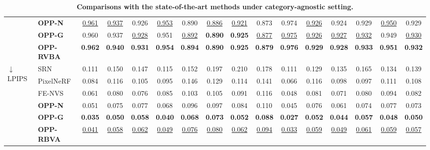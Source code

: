 \begin{table}[t]
\begin{adjustbox}{width=\linewidth,center}
\begin{tabular}{l| l c c c c c c c c c c c c c c}
                                        \cline{2-16}
                                        &\textbf{OPP-N}& \underline{0.961} & \underline{0.937} & {0.926} & \underline{0.953} & {0.890} & \underline{0.886} & \underline{0.921} & {0.873} & {0.974} & \underline{0.926} & {0.924} & {0.929} & \underline{0.950} & {0.929} \\
                                         &\textbf{OPP-G}& {0.960} & {0.937} & \underline{0.928} & {0.951} & \underline{0.892} & \textbf{0.890} & \textbf{0.925} & \underline{0.877} & \underline{0.975} & \underline{0.926} & \underline{0.927} & \underline{0.932} & {0.949} & \underline{0.930} \\
                                         &\textbf{OPP-RVBA}& \textbf{0.962} & \textbf{0.940} & \textbf{0.931} & \textbf{0.954} & \textbf{0.894} & \textbf{0.890} & \textbf{0.925} & \textbf{0.879} & \textbf{0.976} & \textbf{0.929} & \textbf{0.928} & \textbf{0.933} & \textbf{0.951} & \textbf{0.932} \\
         \hline
        \multirow{6}{*}{$\downarrow$ LPIPS} & SRN       & 0.111 & 0.150 & 0.147 & 0.115 & 0.152 & 0.197 & 0.210 & 0.178 & 0.111 & 0.129 & 0.135 & 0.165 & 0.134 & 0.139 \\
                                           & PixelNeRF & 0.084 & 0.116 & 0.105 & 0.095 & 0.146 & 0.129 & 0.114 & 0.141 & 0.066 & 0.116 & 0.098 & 0.097 & 0.111 & 0.108 \\
                                           & FE-NVS    & 0.061 & 0.080 & 0.076 & 0.085 & 0.103 & 0.105 & 0.091 & 0.116 & 0.048 & 0.081 & 0.071 & 0.080 & 0.094 & 0.082 \\
                                         \cline{2-16} &\textbf{OPP-N}& {0.051} & {0.075} & {0.077} & {0.068} & {0.096} & {0.097} & {0.084} & {0.110} & {0.045} & {0.076} & {0.061} & {0.074} & {0.077} & {0.073} \\
                                         &\textbf{OPP-G}& \textbf{0.035} & \textbf{0.050} & \textbf{0.058} & \textbf{0.040} & \textbf{0.068} & \textbf{0.073} & \textbf{0.052} & \textbf{0.088} & \textbf{0.027} & \textbf{0.052} & \textbf{0.044} & \textbf{0.057} & \textbf{0.048} & \textbf{0.050} \\
                                         &\textbf{OPP-RBVA}& 
                            \underline{0.041} & \underline{0.058} & \underline{0.062} & \underline{0.049} & \underline{0.076} & \underline{0.080} & \underline{0.062} & \underline{0.094} & \underline{0.033} & \underline{0.059} & \underline{0.049} & \underline{0.061} & \underline{0.059} & \underline{0.057} \\
         \hline
      \end{tabular}
  \end{adjustbox}
  
  {\caption{\textbf{Comparisons with the state-of-the-art methods under category-agnostic setting.} } 
  \label{tab:category_agnostic}}
\end{table}